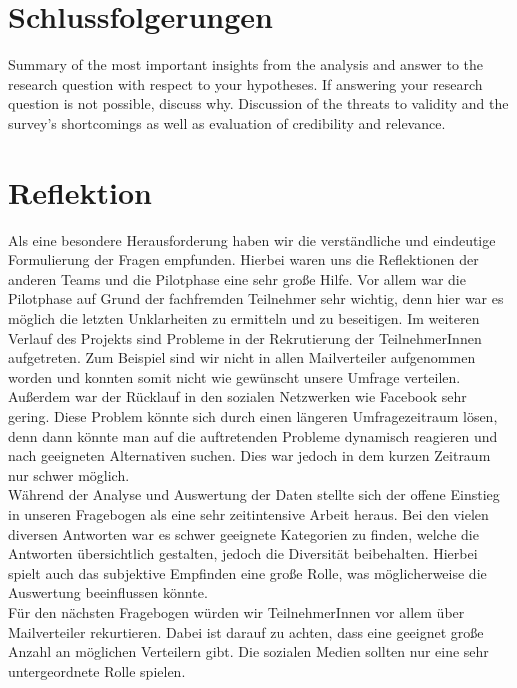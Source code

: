 \documentclass[de]{agse-empir-report}\usepackage[]{graphicx}\usepackage[]{color}
\begin{document}
\section[]{Schlussfolgerungen}
Summary of the most important insights from the analysis and
answer to the research question with respect to your hypotheses.
If answering your research question is not possible, discuss why.
Discussion of the threats to validity and the survey's
shortcomings as well as evaluation of credibility and relevance.


\section[]{Reflektion}

Als eine besondere Herausforderung haben wir die verständliche und eindeutige Formulierung der Fragen empfunden. Hierbei waren uns die Reflektionen der anderen Teams und die Pilotphase eine sehr große Hilfe. Vor allem war die Pilotphase auf Grund der fachfremden Teilnehmer sehr wichtig, denn hier war es möglich die letzten Unklarheiten zu ermitteln und zu beseitigen. Im weiteren Verlauf des Projekts sind Probleme in der Rekrutierung der TeilnehmerInnen aufgetreten. Zum Beispiel sind wir nicht in allen Mailverteiler aufgenommen worden und konnten somit nicht wie gewünscht unsere Umfrage verteilen. Außerdem war der Rücklauf in den sozialen Netzwerken wie Facebook sehr gering. Diese Problem könnte sich durch einen längeren Umfragezeitraum lösen, denn dann könnte man auf die auftretenden Probleme dynamisch reagieren und nach geeigneten Alternativen suchen. Dies war jedoch in dem kurzen Zeitraum nur schwer möglich.\\
Während der Analyse und Auswertung der Daten stellte sich der offene Einstieg in unseren Fragebogen als eine sehr zeitintensive Arbeit heraus. Bei den vielen diversen Antworten war es schwer geeignete Kategorien zu finden, welche die Antworten übersichtlich gestalten, jedoch die Diversität beibehalten. Hierbei spielt auch das subjektive Empfinden eine große Rolle, was möglicherweise die Auswertung beeinflussen könnte.\\
Für den nächsten Fragebogen würden wir TeilnehmerInnen vor allem über Mailverteiler rekurtieren. Dabei ist darauf zu achten, dass eine geeignet große Anzahl an möglichen Verteilern gibt. Die sozialen Medien sollten nur eine sehr untergeordnete Rolle spielen.


\nocite{*}
\end{document}
